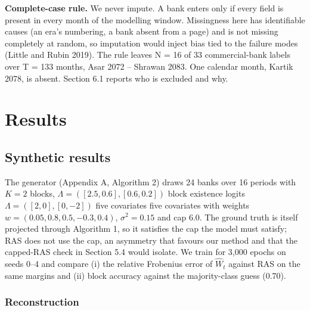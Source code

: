 \documentclass[
  a4paper,
]{article}
\begin{document}
\textbf{Complete-case rule.} We never impute. A bank enters only if
every field is present in every month of the modelling window.
Missingness here has identifiable causes (an era's numbering, a bank
absent from a page) and is not missing completely at random, so
imputation would inject bias tied to the failure modes (Little and Rubin
2019). The rule leaves N = 16 of 33 commercial-bank labels over T = 133
months, Asar 2072 -- Shrawan 2083. One calendar month, Kartik 2078, is
absent. Section 6.1 reports who is excluded and why.

\section{Results}\label{sec-results}

\subsection{Synthetic results}\label{sec-synthetic-results}

The generator (Appendix A, Algorithm 2) draws 24 banks over 16 periods
with \(K = 2\) blocks, \(\Lambda = ([2.5, 0.6], [0.6, 0.2])\) block
existence logits \(\Lambda = ([2, 0], [0, -2])\) five covariates five
covariates with weights \(w = (0.05, 0.8, 0.5, -0.3, 0.4)\),
\(\sigma^2 = 0.15\) and cap 6.0. The ground truth is itself projected
through Algorithm 1, so it satisfies the cap the model must satisfy; RAS
does not use the cap, an asymmetry that favours our method and that the
capped-RAS check in Section 5.4 would isolate. We train for 3,000 epochs
on seeds 0--4 and compare (i) the relative Frobenius error of
\(\hat W_t\) against RAS on the same margins and (ii) block accuracy
against the majority-class guess (0.70).

\subsubsection*{Reconstruction}\label{reconstruction}
\end{document}
